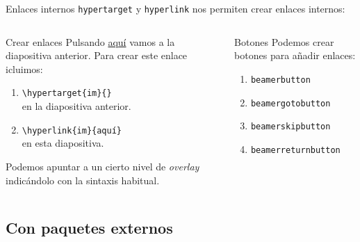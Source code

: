 \begin{frame}{Enlaces internos}
  \texttt{hypertarget} y \texttt{hyperlink} nos permiten crear enlaces internos:
  \espacio
  \begin{columns}
      \pause
      \begin{exampleblock}{Crear enlaces}
        Pulsando \hyperlink{im}{\color{links}aquí} vamos a la diapositiva anterior. Para
        crear este enlace icluimos:
        \begin{enumerate}
          \item \texttt{\textbackslash {\color{keywords}hypertarget}\{im\}\{\}} \\
          en la diapositiva anterior.
          \item \texttt{\textbackslash {\color{keywords}hyperlink}\{im\}\{aquí\}} \\
          en esta diapositiva.
        \end{enumerate}

        Podemos apuntar a un cierto nivel de \textit{overlay} indicándolo con la
        sintaxis habitual.
      \end{exampleblock}
      \pause
      \begin{exampleblock}{Botones}
        Podemos crear botones para añadir enlaces:
        \begin{enumerate}
          \item \texttt{beamerbutton}       \\ \href{https://www.youtube.com/watch?v=dQw4w9WgXcQ}{}
          \item \texttt{beamergotobutton}   \\ \hyperlink{graphs}{}
          \item \texttt{beamerskipbutton}   \\ \hyperlink{end}{}
          \item \texttt{beamerreturnbutton} \\ \hyperlink{index}{}
        \end{enumerate}
      \end{exampleblock}
  \end{columns}
\end{frame}

\subsection{Con paquetes externos}

